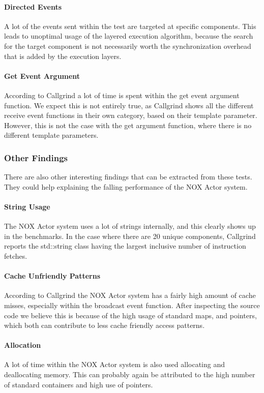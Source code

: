 \paragraph{Directed Events}
A lot of the events sent within the test are targeted at specific components.
This leads to unoptimal usage of the layered execution algorithm, because the search for the target component
is not necessarily worth the synchronization overhead that is added by the execution layers.

\paragraph{Get Event Argument}
According to Callgrind a lot of time is spent within the get event argument function.
We expect this is not entirely true, as Callgrind shows all the different receive event functions in their own category,
based on their template parameter.
However, this is not the case with the get argument function, where there is no different template parameters.

\subsubsection{Other Findings}
There are also other interesting findings that can be extracted from these tests.
They could help explaining the falling performance of the NOX Actor system.

\paragraph{String Usage}
The NOX Actor system uses a lot of strings internally, and this clearly shows up in the benchmarks.
In the case where there are 20 unique components, Callgrind reports the std::string class having the largest
inclusive number of instruction fetches.

\paragraph{Cache Unfriendly Patterns}
According to Callgrind the NOX Actor system has a fairly high amount of cache misses,
especially within the broadcast event function.
After inspecting the source code we believe this is because of the high usage of standard maps, and pointers, which
both can contribute to less cache friendly access patterns.

\paragraph{Allocation}
A lot of time within the NOX Actor system is also used allocating and deallocating memory.
This can probably again be attributed to the high number of standard containers and high use of pointers.

